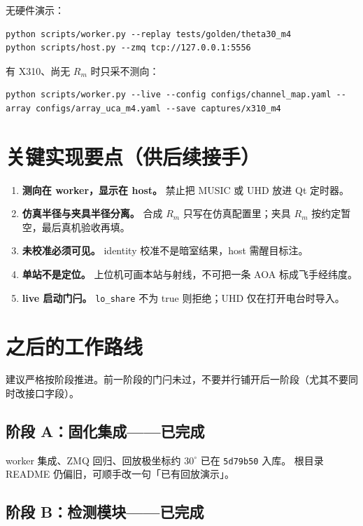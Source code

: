\documentclass[UTF8,a4paper,12pt,zihao=-4]{ctexart}
\newcommand{\done}[1]{\textcolor{doneC}{#1}}
\newcommand{\pend}[1]{\textcolor{pendC}{#1}}
\newcommand{\remind}[1]{\textcolor{remindC}{#1}}
\begin{document}
无硬件演示：

\begin{lstlisting}
python scripts/worker.py --replay tests/golden/theta30_m4
python scripts/host.py --zmq tcp://127.0.0.1:5556
\end{lstlisting}

\pend{有 X310、尚无 $R_m$ 时只采不测向：}

\begin{lstlisting}
python scripts/worker.py --live --config configs/channel_map.yaml --array configs/array_uca_m4.yaml --save captures/x310_m4
\end{lstlisting}

\section{关键实现要点（供后续接手）}

\begin{enumerate}[leftmargin=2em]
  \item \textbf{测向在 worker，显示在 host。} 禁止把 MUSIC 或 UHD 放进 Qt 定时器。
  \item \textbf{仿真半径与夹具半径分离。} 合成 $R_m$ 只写在仿真配置里；\remind{夹具 $R_m$ 按约定暂空，最后真机验收再填。}
  \item \textbf{未校准必须可见。} identity 校准不是暗室结果，host 需醒目标注。
  \item \textbf{单站不是定位。} 上位机可画本站与射线，不可把一条 AOA 标成飞手经纬度。
  \item \textbf{live 启动门闩。} \texttt{lo\_share} 不为 true 则拒绝；UHD 仅在打开电台时导入。
\end{enumerate}

\section{之后的工作路线}

建议严格按阶段推进。前一阶段的门闩未过，不要并行铺开后一阶段（尤其不要同时改接口字段）。

\subsection{\done{阶段 A：固化集成——已完成}}

\done{worker 集成、ZMQ 回归、回放极坐标约 $30^\circ$ 已在 \texttt{5d79b50} 入库。}
\pend{根目录 README 仍偏旧，可顺手改一句「已有回放演示」。}

\subsection{\done{阶段 B：检测模块——已完成}}
\end{document}

